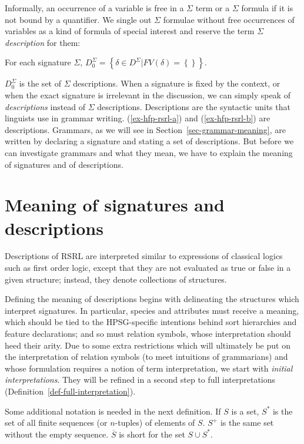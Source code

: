 \documentclass[output=paper
                ,modfonts
                ,nonflat
	        ,collection
	        ,collectionchapter
	        ,collectiontoclongg
 	        ,biblatex
                ,babelshorthands
                ,newtxmath
                ,draftmode
                ,colorlinks, citecolor=brown
]{./langsci/langscibook}
\begin{document}
{{Informally, an occurrence of a variable is free in a $\Sigma$ term or a
$\Sigma$ formula if it is not bound by a quantifier. We single out
$\Sigma$ formulae without free occurrences of variables as a kind of formula
of special interest and reserve the term $\Sigma$ \emph{description} for them:

\begin{mydef}
  For each signature $\Sigma$,
  $D_0^{\Sigma}=\left\{\delta\in D^{\Sigma} | FV(\delta)=\left\{\right\}\right\}$.
\end{mydef}

$D_0^{\Sigma}$ is the set of $\Sigma$ descriptions.
When a signature is fixed by the context, or when the exact signature is
irrelevant in the discussion, we can simply speak of \emph{descriptions}
instead of $\Sigma$ descriptions. Descriptions are the syntactic units
that linguists use in grammar writing. (\ref{ex-hfp-rsrl-a}) and (\ref{ex-hfp-rsrl-b}) are descriptions. Grammars, as we will see in
Section~\ref{sec-grammar-meaning}, are written by declaring a signature
and stating a set of descriptions. But before we can investigate grammars and
what they mean, we
have to explain the meaning of signatures and of descriptions.


  
\section{Meaning of signatures and descriptions}
\label{sec-meaning}

Descriptions of RSRL are interpreted similar to expressions of
classical logics such as first order logic, except that they are not
evaluated as true or false in a given structure; instead, they denote
collections of structures.

Defining the meaning of descriptions begins with delineating the
structures which interpret signatures. In particular, species and
attributes must receive a meaning, which should be tied to the
HPSG-specific intentions behind sort hierarchies and feature
declarations; and so must relation symbols, whose interpretation
should heed their arity. Due to some extra restrictions which will
ultimately be put on the interpretation of relation symbols (to meet
intuitions of grammarians) and whose
formulation requires a notion of term interpretation, we start with
\emph{initial interpretations}. They will be refined in a second
step to full interpretations (Definition~\ref{def-full-interpretation}).

Some additional notation is needed in the next definition. If $S$ is a
set, $S^{*}$ is the set of all finite sequences (or $n$-tuples) of elements
of $S$. $S^{+}$ is the same set without the empty sequence. $\overline{S}$
is short for the set $S\cup S^{*}$.

}}
\end{document}
